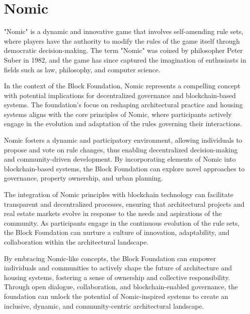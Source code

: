 \newpage
\section{Nomic}


"Nomic" is a dynamic and innovative game that involves self-amending rule sets, where players have the authority to modify the rules of the game itself through democratic decision-making. The term "Nomic" was coined by philosopher Peter Suber in 1982, and the game has since captured the imagination of enthusiasts in fields such as law, philosophy, and computer science.

In the context of the Block Foundation, Nomic represents a compelling concept with potential implications for decentralized governance and blockchain-based systems. The foundation's focus on reshaping architectural practice and housing systems aligns with the core principles of Nomic, where participants actively engage in the evolution and adaptation of the rules governing their interactions.

Nomic fosters a dynamic and participatory environment, allowing individuals to propose and vote on rule changes, thus enabling decentralized decision-making and community-driven development. By incorporating elements of Nomic into blockchain-based systems, the Block Foundation can explore novel approaches to governance, property ownership, and urban planning.

The integration of Nomic principles with blockchain technology can facilitate transparent and decentralized processes, ensuring that architectural projects and real estate markets evolve in response to the needs and aspirations of the community. As participants engage in the continuous evolution of the rule sets, the Block Foundation can nurture a culture of innovation, adaptability, and collaboration within the architectural landscape.

By embracing Nomic-like concepts, the Block Foundation can empower individuals and communities to actively shape the future of architecture and housing systems, fostering a sense of ownership and collective responsibility. Through open dialogue, collaboration, and blockchain-enabled governance, the foundation can unlock the potential of Nomic-inspired systems to create an inclusive, dynamic, and community-centric architectural landscape.